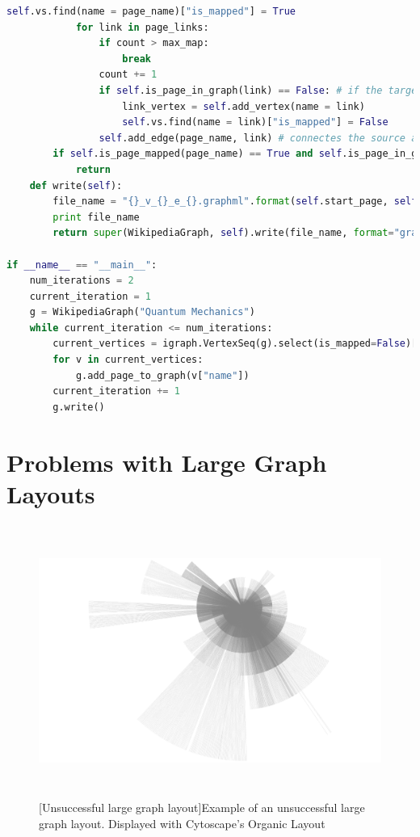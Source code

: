\documentclass[man, 12pt, floatsintext, donotrepeattitle]{apa6}
\begin{document}
\begin{lstlisting}[language=Python, caption=Complete Python Implementation of
  the Mapping Algorithm]
            self.vs.find(name = page_name)["is_mapped"] = True
            for link in page_links:
                if count > max_map:
                    break
                count += 1
                if self.is_page_in_graph(link) == False: # if the target page isn't already in the graph
                    link_vertex = self.add_vertex(name = link)
                    self.vs.find(name = link)["is_mapped"] = False
                self.add_edge(page_name, link) # connectes the source and target pages
        if self.is_page_mapped(page_name) == True and self.is_page_in_graph(page_name) == True:
            return
    def write(self):
        file_name = "{}_v_{}_e_{}.graphml".format(self.start_page, self.vcount(), self.ecount())
        print file_name
        return super(WikipediaGraph, self).write(file_name, format="graphml")

if __name__ == "__main__":
    num_iterations = 2
    current_iteration = 1
    g = WikipediaGraph("Quantum Mechanics")
    while current_iteration <= num_iterations:
        current_vertices = igraph.VertexSeq(g).select(is_mapped=False)[:]
        for v in current_vertices:
            g.add_page_to_graph(v["name"])
        current_iteration += 1
        g.write()
\end{lstlisting}
\section{Problems with Large Graph Layouts}
\begin{figure}[]
  \centering
    \includegraphics[width=6in, height=3.5in]{Resources/nolimit/2iterations/QuantumMechanics_v_45656_e_175822_nolimit_a.png}
  [Unsuccessful large graph layout]{Example of an unsuccessful large graph layout.  Displayed with Cytoscape's Organic Layout
    \label{fig:largeSuccess}}
\end{figure}

\nocite{*}
\printbibliography[heading=bibnumbered]
\end{document}
